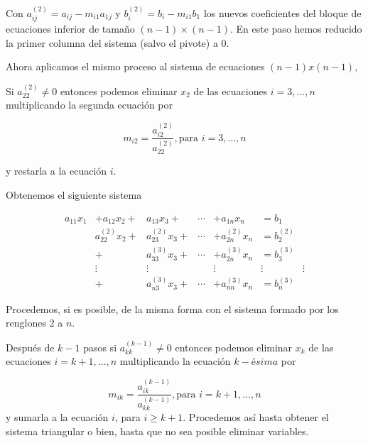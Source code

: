 \documentclass[
]{article}
\begin{document}
Con \(a^{(2)}_{ij} = a_{ij}- m_{i1}a_{1j}\) y
\(b^{(2)}_i=b_i-m_{i1}b_1\) los nuevos coeficientes del bloque de
ecuaciones inferior de tamaño \((n-1)\times(n-1)\). En este paso hemos
reducido la primer columna del sistema (salvo el pivote) a \(0\).

Ahora aplicamos el mismo proceso al sistema de ecuaciones
\((n-1)x(n-1)\),

Si \(a^{(2)}_{22}\ne 0\) entonces podemos eliminar \(x_2\) de las
ecuaciones \(i=3,\ldots,n\) multiplicando la segunda ecuación por

\begin{equation*}
m_{i2}=\frac{a^{(2)}_{i2}}{a^{(2)}_{22}}, \mbox{para }i=3,\ldots,n
\end{equation*}

y restarla a la ecuación \(i\).

Obtenemos el siguiente sistema

\begin{equation}
  \begin{matrix}
     a_{11} x_1 & +a_{12} x_2      + & a_{13}x_3 +      & \cdots   & +a_{1n} x_n  &= b_1  \\
                & a^{(2)}_{22} x_2 + & a^{(2)}_{23}x_3 +& \cdots   & +a^{(2)}_{2n} x_n  &= b^{(2)}_2\\
                &                  +& a^{(3)}_{33}x_3 +& \cdots   & +a^{(3)}_{2n} x_n  &= b^{(3)}_3\\
                & \vdots           & \vdots&          & \vdots   &    \vdots          & \vdots\\
                &                  +& a^{(3)}_{n3}x_3 +& \cdots   & +a^{(3)}_{nn} x_n  & =b^{(3)}_n
  \end{matrix}
\end{equation}

Procedemos, si es posible, de la misma forma con el sistema formado por
los renglones 2 a \(n\).

Después de \(k-1\) pasos si \(a^{(k-1)}_{kk}\ne 0\) entonces podemos
eliminar \(x_k\) de las ecuaciones \(i=k+1,\ldots,n\) multiplicando la
ecuación \(k-ésima\) por

\begin{equation*}
m_{ik}=\frac{a^{(k-1)}_{ik}}{a^{(k-1)}_{kk}}, \mbox{para }i=k+1,\ldots,n
\end{equation*} y sumarla a la ecuación \(i\), para \(i\geqslant k+1\).
Procedemos así hasta obtener el sistema triangular o bien, hasta que no
sea posible eliminar variables.
\end{document}
